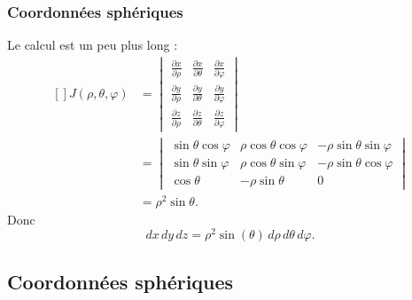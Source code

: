 \subsubsection{Coordonnées sphériques}

Le calcul est un peu plus long :
\begin{equation}
	\begin{aligned}[]
		J(\rho,\theta,\varphi) & =\begin{vmatrix}
			\frac{ \partial x }{ \partial \rho } & \frac{ \partial x }{ \partial \theta } & \frac{ \partial x }{ \partial \varphi } \\
			\frac{ \partial y }{ \partial \rho } & \frac{ \partial y }{ \partial \theta } & \frac{ \partial y }{ \partial \varphi } \\
			\frac{ \partial z }{ \partial \rho } & \frac{ \partial z }{ \partial \theta } & \frac{ \partial z }{ \partial \varphi }
		\end{vmatrix} \\
		                       & =
		\begin{vmatrix}
			\sin\theta\cos\varphi & \rho\cos\theta\cos\varphi & -\rho\sin\theta\sin\varphi \\
			\sin\theta\sin\varphi & \rho\cos\theta\sin\varphi & -\rho\sin\theta\cos\varphi \\
			\cos\theta            & -\rho\sin\theta           & 0
		\end{vmatrix}                           \\
		                       & =\rho^2\sin\theta.
	\end{aligned}
\end{equation}
Donc
\begin{equation}
	dx\,dy\,dz=\rho^2\sin(\theta)\,d\rho\,d\theta\,d\varphi.
\end{equation}

\subsection{Coordonnées sphériques}

